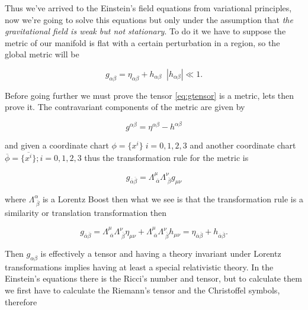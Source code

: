         Thus we've arrived to the Einstein's field equations from variational principles, now we're going to solve this equations but only under the assumption that \textit{the gravitational field is weak but not stationary}. To do it we have to suppose the metric of our manifold is flat with a certain perturbation in a region, so the global metric will be

        \begin{equation}\label{eq:gtensor}
            g_{\alpha\beta} = \eta_{\alpha\beta} + h_{\alpha\beta}\;\;|h_{\alpha\beta}|\ll 1.
        \end{equation}

        Before going further we must prove the tensor \ref{eq:gtensor} is a metric, lets then prove it. The contravariant components of the metric are given by

        \begin{equation}
            g^{\alpha\beta} = \eta^{\alpha\beta} - h^{\alpha\beta}
        \end{equation}

        and given a coordinate chart $\phi = \{x^i\}\;i=0,1,2,3$ and another coordinate chart $\overline{\phi} = \{\overline{x^i}\};i=0,1,2,3$  thus the transformation rule for the metric is

        \begin{equation}
            g_{\overline{\alpha}\overline{\beta}} = \Lambda^{\mu}_{\;\overline{\alpha}}\Lambda^{\nu}_{\;\overline{\beta}}g_{\mu\nu}
        \end{equation}

        where $\Lambda^{\alpha}_{\;\overline{\beta}}$ is a Lorentz Boost then what we see is that the transformation rule is a similarity or translation transformation then

        \begin{equation}
            g_{\overline{\alpha}\overline{\beta}} = \Lambda^{\mu}_{\;\overline{\alpha}}\Lambda^{\nu}_{\;\overline{\beta}}\eta_{\mu\nu} + \Lambda^{\mu}_{\;\overline{\alpha}}\Lambda^{\nu}_{\;\overline{\beta}}h_{\mu\nu} = \eta_{\overline{\alpha} \overline{\beta}} + h_{\overline{\alpha} \overline{\beta}}.
        \end{equation}

        Then $g_{\alpha\beta}$ is effectively a tensor and having a theory invariant under Lorentz transformations implies having at least a special relativistic theory. In the Einstein's equations there is the Ricci's number and tensor, but to calculate them we first have to calculate the Riemann's tensor and the Christoffel symbols, therefore

